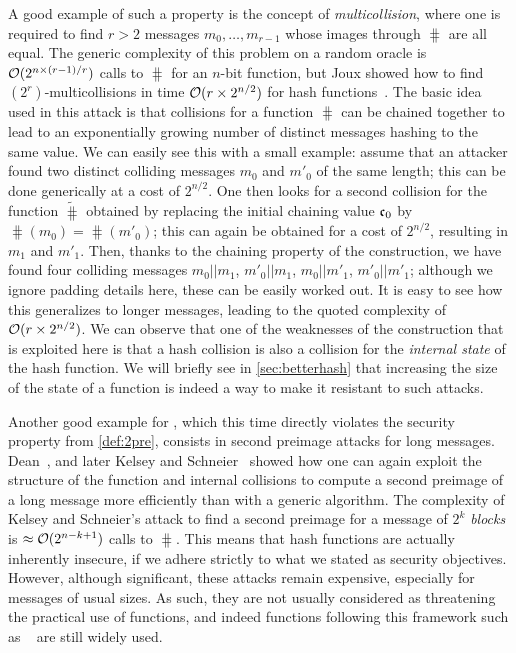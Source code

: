 A good example of such a property is the concept of \emph{multicollision}, where one is required to find $r > 2$ messages $m_{0},\ldots,m_{r-1}$ whose images through $\hash$
are all equal. The generic complexity of this problem on a random oracle is $\operatorname{\mathcal{O}}(2^{n\times (r-1)/r})$ calls to $\hash$ for an $n$-bit function, but Joux showed how to
find $(2^r)$-multicollisions in time $\operatorname{\mathcal{O}}(r\times 2^{n/2})$ for \merkdam hash functions~\cite{DBLP:conf/crypto/Joux04}.
The basic idea used in this attack is that collisions for a \merkdam function $\hash$ can be chained together to lead to an exponentially growing number of distinct messages hashing
to the same value. We can easily see this with a small example: assume that an attacker found two distinct colliding messages $m_0$ and $m'_0$ of the same length;
this can be done generically at a cost of $2^{n/2}$. One then looks for a second collision for the function $\widetilde \hash$ obtained by replacing the initial chaining
value $\mathfrak{c}_0$ by $\hash(m_0) = \hash(m'_0)$; this can again be obtained for a cost of $2^{n/2}$, resulting in $m_1$ and $m'_1$. Then, thanks to
the chaining property of the \merkdam construction, we have found four colliding messages $m_0||m_1$, $m'_0||m_1$, $m_0||m'_1$, $m'_0||m'_1$; although we ignore
padding details here, these can be easily worked out. It is easy to see how this generalizes to longer messages, leading to the quoted complexity of $\operatorname{\mathcal{O}}(r \times 2^{n/2})$.
We can observe that one of the weaknesses of the construction that is exploited here is that a hash collision is also
a collision for the \emph{internal state} of the hash function. We will briefly see in \autoref{sec:betterhash} that increasing the size of the state of a function is indeed a way to make it resistant
to such attacks.

Another good example for \merkdam, which this time directly violates the security property from \autoref{def:2pre}, consists in second preimage attacks for long messages.
Dean~\cite{dean}, and later Kelsey and Schneier~\cite{DBLP:conf/eurocrypt/KelseyS05} showed how one can again exploit the structure of the function and internal collisions to compute a second preimage
of a long message more efficiently than with a generic algorithm. The complexity of Kelsey and Schneier's attack to find a second preimage for a message
of $2^k$ \emph{blocks} is $\approx \operatorname{\mathcal{O}}(2^{n-k+1})$ calls to $\hash$. This means that \merkdam hash functions are actually inherently insecure, if we adhere
strictly to what we stated as security objectives. However, although significant, these attacks remain expensive, especially for messages of usual sizes. As such, they are not usually considered as threatening
the practical use of \merkdam functions, and indeed functions following this framework such as \shatwo~\cite{Nist-SHA} are still widely used.

